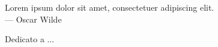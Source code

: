 \cleardoublepage
{}
\thispagestyle{empty}

\vspace*{3cm}

\begin{center}
Lorem ipsum dolor sit amet, consectetuer adipiscing elit. \\ \medskip
--- Oscar Wilde    
\end{center}

\medskip

\begin{center}
Dedicato a ...
\end{center}
